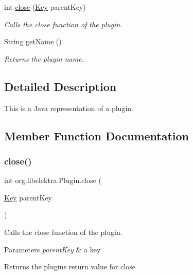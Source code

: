 \begin{DoxyCompactItemize}
int \mbox{\hyperlink{interfaceorg_1_1libelektra_1_1Plugin_aa5d4abf6ffd0d477d6972b13bed05d41}{close}} (\mbox{\hyperlink{classorg_1_1libelektra_1_1Key}{Key}} parent\+Key)
\begin{DoxyCompactList}\small\item\em Calls the close function of the plugin. \end{DoxyCompactList}\item 
String \mbox{\hyperlink{interfaceorg_1_1libelektra_1_1Plugin_a51be1d6efdd3542c2ae503031bd16e04}{get\+Name}} ()
\begin{DoxyCompactList}\small\item\em Returns the plugin name. \end{DoxyCompactList}\end{DoxyCompactItemize}


\subsection{Detailed Description}
This is a Java representation of a plugin. 

\subsection{Member Function Documentation}
\mbox{\label{interfaceorg_1_1libelektra_1_1Plugin_aa5d4abf6ffd0d477d6972b13bed05d41}} 
\subsubsection{\texorpdfstring{close()}{close()}}
{\footnotesize\ttfamily int org.\+libelektra.\+Plugin.\+close (\begin{DoxyParamCaption}\item[{\mbox{\hyperlink{classorg_1_1libelektra_1_1Key}{Key}}}]{parent\+Key }\end{DoxyParamCaption})}



Calls the close function of the plugin. 


\begin{DoxyParams}{Parameters}
{\em parent\+Key} & a key \\
\hline
\end{DoxyParams}
\begin{DoxyReturn}{Returns}
the plugin\textquotesingle{}s return value for close 
\end{DoxyReturn}


